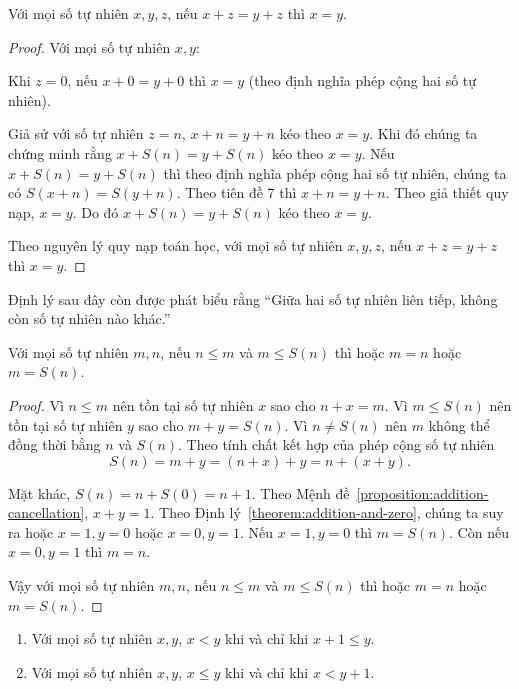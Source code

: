 \begin{proposition}\label{proposition:addition-cancellation}
    Với mọi số tự nhiên $x, y, z$, nếu $x + z = y + z$ thì $x = y$.
\end{proposition}

\begin{proof}
    Với mọi số tự nhiên $x, y$:

    Khi $z = 0$, nếu $x + 0 = y + 0$ thì $x = y$ (theo định nghĩa phép cộng hai số tự nhiên).

    Giả sử với số tự nhiên $z = n$, $x + n = y + n$ kéo theo $x = y$. Khi đó chúng ta chứng minh rằng $x + S(n) = y + S(n)$ kéo theo $x = y$. Nếu $x + S(n) = y + S(n)$ thì theo định nghĩa phép cộng hai số tự nhiên, chúng ta có $S(x + n) = S(y + n)$. Theo tiên đề 7 thì $x + n = y + n$. Theo giả thiết quy nạp, $x = y$. Do đó $x + S(n) = y + S(n)$ kéo theo $x = y$.

    Theo nguyên lý quy nạp toán học, với mọi số tự nhiên $x, y, z$, nếu $x + z = y + z$ thì $x = y$.
\end{proof}

Định lý sau đây còn được phát biểu rằng ``Giữa hai số tự nhiên liên tiếp, không còn số tự nhiên nào khác.''
\begin{theorem}
    Với mọi số tự nhiên $m, n$, nếu $n\leq m$ và $m \leq S(n)$ thì hoặc $m = n$ hoặc $m = S(n)$.
\end{theorem}

\begin{proof}
    Vì $n\leq m$ nên tồn tại số tự nhiên $x$ sao cho $n + x = m$. Vì $m\leq S(n)$ nên tồn tại số tự nhiên $y$ sao cho $m + y = S(n)$. Vì $n\ne S(n)$ nên $m$ không thể đồng thời bằng $n$ và $S(n)$. Theo tính chất kết hợp của phép cộng số tự nhiên
    \[
        S(n) = m + y = (n + x) + y = n + (x + y).
    \]

    Mặt khác, $S(n) = n + S(0) = n + 1$. Theo Mệnh đề~\ref{proposition:addition-cancellation}, $x + y = 1$. Theo Định lý~\ref{theorem:addition-and-zero}, chúng ta suy ra hoặc $x = 1, y = 0$ hoặc $x = 0, y = 1$. Nếu $x = 1, y = 0$ thì $m = S(n)$. Còn nếu $x = 0, y = 1$ thì $m = n$.

    Vậy với mọi số tự nhiên $m, n$, nếu $n\leq m$ và $m \leq S(n)$ thì hoặc $m = n$ hoặc $m = S(n)$.
\end{proof}

\begin{corollary}
    \begin{enumerate}[label={(\roman*)}]
        \item Với mọi số tự nhiên $x, y$, $x < y$ khi và chỉ khi $x + 1\leq y$.
        \item Với mọi số tự nhiên $x, y$, $x\leq y$ khi và chỉ khi $x < y + 1$.
    \end{enumerate}
\end{corollary}

